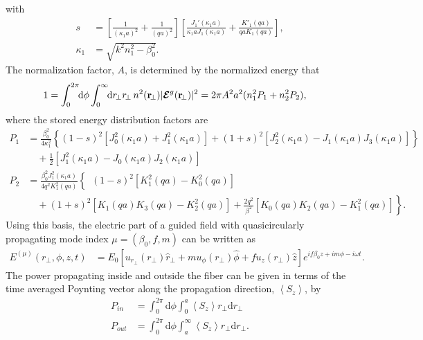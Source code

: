 \documentclass[preprint,aps,pra,onecolumn]{revtex4-1} %
\begin{document}
with
\begin{align}
s &= \left[\frac{1}{(\kappa_1a)^2}+ \frac{1}{(qa)^2} \right] \left[ \frac{J_1'(\kappa_1a)}{\kappa_1aJ_1(\kappa_1a)} + \frac{K'_1(qa)}{qaK_1(qa)} \right],\\
\kappa_1 &= \sqrt{k^2 n_1^2-\beta_0^2}.
\end{align}
The normalization factor, $A$, is determined by the normalized energy that 
\begin{align}
1 &= \int_0^{2\pi} \!\!\mathrm{d} \phi \int_0^\infty\!\!\mathrm{d}r\!_\perp r\!_\perp\,  n^2(\br\!_\perp)|\boldsymbol{\mathcal{E}}^g(\br\!_\perp)|^2 = 2\pi A^2 a^2 (n_1^2P_1 + n_2^2P_2),
\end{align}
where the stored energy distribution factors are
\begin{align}
\!\!\!\!\! P_1
&= \frac{\beta_0^2}{4\kappa_1^2}\!\left\{(1\!-\! s)^2\!\left[J_0^2(\kappa_1a)\!+\! J_1^2(\kappa_1a) \right] \!+\!(1\!+\!s)^2\!\left[J_2^2(\kappa_1a)\!-\!J_1(\kappa_1a)J_3(\kappa_1a) \right]\right\}\nonumber\\
&\quad +\frac{1}{2}\left[J_1^2(\kappa_1a)-J_0(\kappa_1a)J_2(\kappa_1a) \right] \\
\!\!\!\!\! P_2
&= \frac{\beta_0^2J_1^2(\kappa_1a)}{4q^2K_1^2(qa)}\!\left\{\phantom{\frac{1}{1}}\!\!\!\!(1\!-\!s)^2\!\left[K_1^2(qa)\!-\!K_0^2(qa) \right]\right.\nonumber\\
&\quad\left. \!+(1\!+\!s)^2\!\!\left[K\!_1\!(qa)K\!_3\!(qa)\!-\! K_2^2\!(qa) \right]\!+\!\frac{2q^2}{\beta^2}\!\!\left[K\!_0\!(qa)K\!_2\!(qa)\!-\!K_1^2\!(qa) \right]  \right\}.
\end{align}
Using this basis, the electric part of a guided field with quasicircularly propagating mode index $\mu=(\beta_0, f, m)$ can be written as 
\begin{align}
E^{(\mu)}(r\!_\perp,\phi,z,t) &=E_0\left[u_{r\!_\perp}\!(r\!_\perp) \hat{r}\!_\perp \!+\! m u_{\phi}(r\!_\perp) \hat{\phi} \!+\! f u_z (r\!_\perp) \hat{z}\right]e^{if\beta_0 z+im\phi-i\omega t }.
\end{align}
The power propagating inside and outside the fiber can be given in terms of the time averaged Poynting vector along the propagation direction, $\left< S_z \right>$, by
\begin{align}
P_{in} &= \int_0^{2\pi} \mathrm{d}\phi \int_0^a \left< S_z \right> r\!_\perp \mathrm{d}r\!_\perp\\
P_{out} &= \int_0^{2\pi} \mathrm{d}\phi \int_a^\infty \left< S_z \right> r\!_\perp \mathrm{d}r\!_\perp.
\end{align}
\end{document}
